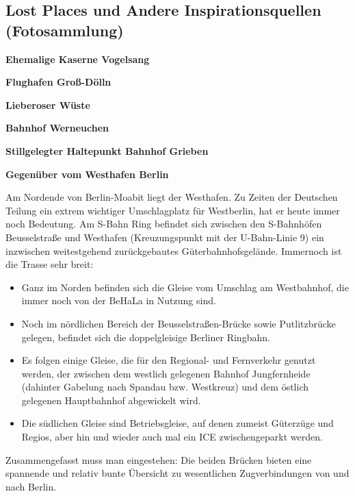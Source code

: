 \subsection{Lost Places und Andere Inspirationsquellen (Fotosammlung)}
\label{sec:personalAppendix_lostPlaces}

\textbf{Ehemalige Kaserne Vogelsang}


\textbf{Flughafen Gro{\ss}-D\"olln}


\textbf{Lieberoser W\"uste}


\textbf{Bahnhof Werneuchen}


\textbf{Stillgelegter Haltepunkt Bahnhof Grieben}


\textbf{Gegen\"uber vom Westhafen Berlin}

Am Nordende von Berlin-Moabit liegt der Westhafen.
Zu Zeiten der Deutschen Teilung ein extrem wichtiger Umschlagplatz f\"ur Westberlin, hat er heute immer noch Bedeutung.
Am S-Bahn Ring befindet sich zwischen den S-Bahnh\"ofen Beusselstra{\ss}e und Westhafen (Kreuzungspunkt mit der U-Bahn-Linie 9) ein inzwischen weitestgehend zur\"uckgebautes G\"uterbahnhofsgel\"ande.
Immernoch ist die Trasse sehr breit:
\begin{itemize}
	\item Ganz im Norden befinden sich die Gleise vom Umschlag am Westbahnhof, die immer noch von der BeHaLa in Nutzung sind.
	\item Noch im n\"ordlichen Bereich der Beusselstra{\ss}en-Br\"ucke sowie Putlitzbr\"ucke gelegen, befindet sich die doppelgleisige Berliner Ringbahn.
	\item Es folgen einige Gleise, die f\"ur den Regional- und Fernverkehr genutzt werden, der zwischen dem westlich gelegenen Bahnhof Jungfernheide (dahinter Gabelung nach Spandau bzw. Westkreuz) und dem \"ostlich gelegenen Hauptbahnhof abgewickelt wird.
	\item Die s\"udlichen Gleise sind Betriebsgleise, auf denen zumeist G\"uterz\"uge und Regios, aber hin und wieder auch mal ein ICE zwischengeparkt werden.
\end{itemize}
Zusammengefasst muss man eingestehen: Die beiden Br\"ucken bieten eine spannende und relativ bunte \"Ubersicht zu wesentlichen Zugverbindungen von und nach Berlin.

